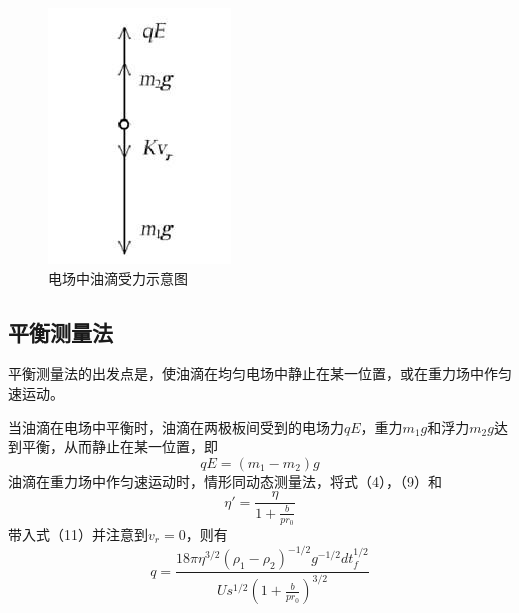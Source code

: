 \documentclass[fontset=windows,16pt]{ctexart}
\begin{document}
\begin{figure}[H]
\begin{minipage}[t]{0.2\textwidth}
        \includegraphics[width=\textwidth]{img/受力2.jpg}
        \caption{电场中油滴受力示意图}
        \label{fig:force2}
    \end{minipage}
\end{figure}

\subsection{平衡测量法}
平衡测量法的出发点是，使油滴在均匀电场中静止在某一位置，或在重力场中作匀速运动。

当油滴在电场中平衡时，油滴在两极板间受到的电场力\( qE \)，重力\( m_1g \)和浮力\( m_2g \)达到平衡，从而静止在某一位置，即
\[
qE = (m_1 - m_2)g \tag{12}
\]
油滴在重力场中作匀速运动时，情形同动态测量法，将式（4），（9）和
\[
\eta' = \frac{\eta}{1 + \frac{b}{pr_0}}
\]
带入式（11）并注意到\( v_r = 0 \)，则有
\[
q = \frac{18\pi\eta^{3/2} (\rho_1 - \rho_2)^{-1/2} g^{-1/2} d t_f^{1/2}}{U s^{1/2} \left(1 + \frac{b}{pr_0}\right)^{3/2}} \tag{13}
\]
\end{document}
